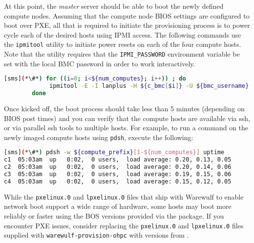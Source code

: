 At this point, the {\em master} server should be able to boot the newly defined
compute nodes. Assuming that the compute node BIOS settings are configured to
boot over PXE, all that is required to initiate the provisioning process is to
power cycle each of the desired hosts using IPMI access.
The following commands use the \texttt{ipmitool} utility to initiate power
resets on each of the four compute hosts. Note that the utility requires that
the \texttt{IPMI\_PASSWORD} environment variable be set with the local BMC password in
order to work interactively.

\begin{lstlisting}[language=bash,keywords={},upquote=true]
[sms](*\#*) for ((i=0; i<${num_computes}; i++)) ; do
             ipmitool -E -I lanplus -H ${c_bmc[$i]} -U ${bmc_username} -P ${bmc_password} chassis power reset
        done
\end{lstlisting} 

Once kicked off, the boot process should take less than 5 minutes (depending on
BIOS post times) and you can verify that the compute hosts are available via
ssh, or via parallel ssh tools to multiple hosts. For example, to run a command
on the newly imaged compute hosts using \texttt{pdsh}, execute the following:

  
\begin{lstlisting}[language=bash]
[sms](*\#*) pdsh -w ${compute_prefix}[1-${num_computes}] uptime
c1  05:03am  up   0:02,  0 users,  load average: 0.20, 0.13, 0.05
c2  05:03am  up   0:02,  0 users,  load average: 0.20, 0.14, 0.06
c3  05:03am  up   0:02,  0 users,  load average: 0.19, 0.15, 0.06
c4  05:03am  up   0:02,  0 users,  load average: 0.15, 0.12, 0.05
\end{lstlisting}

\begin{center}
\begin{tcolorbox}[]
\small While the \texttt{pxelinux.0} and \texttt{lpxelinux.0} files that ship
with Warewulf to enable network boot support a wide range of hardware, some
hosts may boot more reliably or faster using the BOS versions provided via the
\texttt{\tftppkg{}} package. If you encounter PXE issues, consider
replacing the \texttt{pxelinux.0} and \texttt{lpxelinux.0} files supplied with
\texttt{warewulf-provision-ohpc} with versions from \texttt{\tftppkg{}}.
\end{tcolorbox}
\end{center}
\fi

